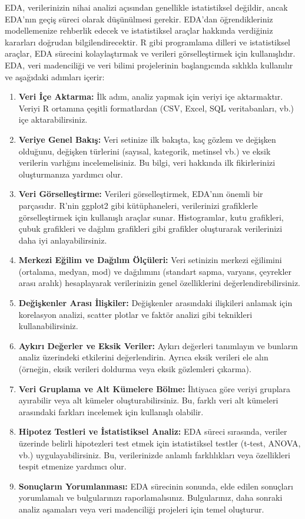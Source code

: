\documentclass[
  letterpaper,
  DIV=11,
  numbers=noendperiod]{scrreprt}
\begin{document}
EDA, verilerinizin nihai analizi açısından genellikle istatistiksel
değildir, ancak EDA'nın geçiş süreci olarak düşünülmesi gerekir. EDA'dan
öğrendikleriniz modellemenize rehberlik edecek ve istatistiksel araçlar
hakkında verdiğiniz kararları doğrudan bilgilendirecektir. R gibi
programlama dilleri ve istatistiksel araçlar, EDA sürecini
kolaylaştırmak ve verileri görselleştirmek için kullanışlıdır. EDA, veri
madenciliği ve veri bilimi projelerinin başlangıcında sıklıkla
kullanılır ve aşağıdaki adımları içerir:

\begin{enumerate}
\def\labelenumi{\arabic{enumi}.}
\item
  \textbf{Veri İçe Aktarma:} İlk adım, analiz yapmak için veriyi içe
  aktarmaktır. Veriyi R ortamına çeşitli formatlardan (CSV, Excel, SQL
  veritabanları, vb.) içe aktarabilirsiniz.
\item
  \textbf{Veriye Genel Bakış:} Veri setinize ilk bakışta, kaç gözlem ve
  değişken olduğunu, değişken türlerini (sayısal, kategorik, metinsel
  vb.) ve eksik verilerin varlığını incelemelisiniz. Bu bilgi, veri
  hakkında ilk fikirlerinizi oluşturmanıza yardımcı olur.
\item
  \textbf{Veri Görselleştirme:} Verileri görselleştirmek, EDA'nın önemli
  bir parçasıdır. R'nin ggplot2 gibi kütüphaneleri, verilerinizi
  grafiklerle görselleştirmek için kullanışlı araçlar sunar.
  Histogramlar, kutu grafikleri, çubuk grafikleri ve dağılım grafikleri
  gibi grafikler oluşturarak verilerinizi daha iyi anlayabilirsiniz.
\item
  \textbf{Merkezi Eğilim ve Dağılım Ölçüleri:} Veri setinizin merkezi
  eğilimini (ortalama, medyan, mod) ve dağılımını (standart sapma,
  varyans, çeyrekler arası aralık) hesaplayarak verilerinizin genel
  özelliklerini değerlendirebilirsiniz.
\item
  \textbf{Değişkenler Arası İlişkiler:} Değişkenler arasındaki
  ilişkileri anlamak için korelasyon analizi, scatter plotlar ve faktör
  analizi gibi teknikleri kullanabilirsiniz.
\item
  \textbf{Aykırı Değerler ve Eksik Veriler:} Aykırı değerleri tanımlayın
  ve bunların analiz üzerindeki etkilerini değerlendirin. Ayrıca eksik
  verileri ele alın (örneğin, eksik verileri doldurma veya eksik
  gözlemleri çıkarma).
\item
  \textbf{Veri Gruplama ve Alt Kümelere Bölme:} İhtiyaca göre veriyi
  gruplara ayırabilir veya alt kümeler oluşturabilirsiniz. Bu, farklı
  veri alt kümeleri arasındaki farkları incelemek için kullanışlı
  olabilir.
\item
  \textbf{Hipotez Testleri ve İstatistiksel Analiz:} EDA süreci
  sırasında, veriler üzerinde belirli hipotezleri test etmek için
  istatistiksel testler (t-test, ANOVA, vb.) uygulayabilirsiniz. Bu,
  verilerinizde anlamlı farklılıkları veya özellikleri tespit etmenize
  yardımcı olur.
\item
  \textbf{Sonuçların Yorumlanması:} EDA sürecinin sonunda, elde edilen
  sonuçları yorumlamalı ve bulgularınızı raporlamalısınız. Bulgularınız,
  daha sonraki analiz aşamaları veya veri madenciliği projeleri için
  temel oluşturur.
\end{enumerate}
\end{document}
